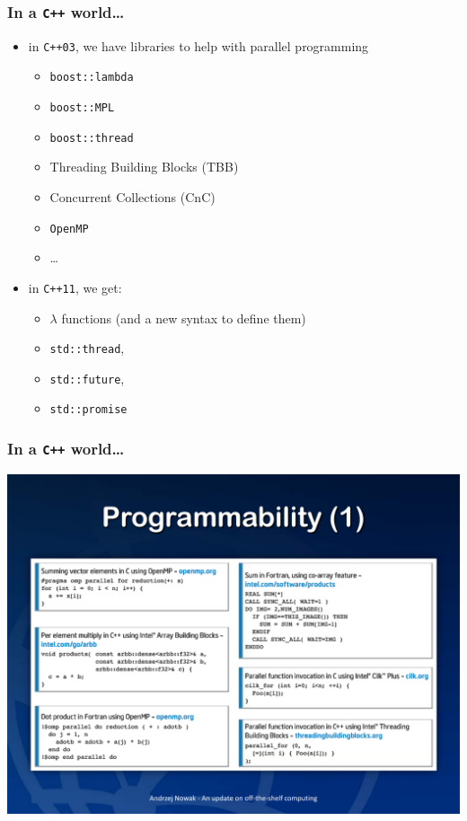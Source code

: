 \documentclass[9pt]{beamer}
\begin{document}
\begin{frame}
\frametitle{In a \verb~C++~ world\ldots{}}

\begin{itemize}
\item in \verb~C++03~, we have libraries to help with parallel programming
\begin{itemize}
\item \verb~boost::lambda~
\item \verb~boost::MPL~
\item \verb~boost::thread~
\item Threading Building Blocks (TBB)
\item Concurrent Collections (CnC)
\item \verb~OpenMP~
\item \ldots{}
\end{itemize}
\end{itemize}

\begin{itemize}
\item in \verb~C++11~, we get:
\begin{itemize}
\item $\lambda$ functions (and a new syntax to define them)
\item \verb~std::thread~,
\item \verb~std::future~,
\item \verb~std::promise~
\end{itemize}
\end{itemize}
\end{frame}

\begin{frame}[fragile]
  \frametitle{In a \verb~C++~ world\ldots{}}
  \begin{center}
    \includegraphics[width=1.\linewidth]{figs/nowak-progs-1.pdf}
  \end{center}
\end{frame}
\end{document}
